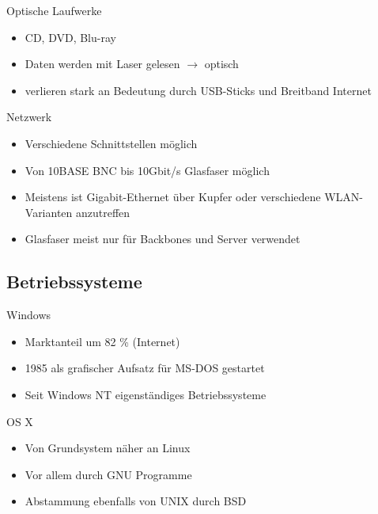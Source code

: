 \documentclass[aspectratio=43]{beamer}
\begin{document}
\begin{frame} 

	\begin{block}{Optische Laufwerke} 
	\begin{itemize}
	\item CD, DVD, Blu-ray
	\item Daten werden mit Laser gelesen $\rightarrow$ optisch
	\item verlieren stark an Bedeutung durch USB-Sticks und Breitband Internet
	\end{itemize}
	\end{block}

	\begin{block}{Netzwerk} 
	\begin{itemize}
	\item Verschiedene Schnittstellen möglich
	\item Von 10BASE BNC bis 10Gbit/s Glasfaser möglich
	\item Meistens ist Gigabit-Ethernet über Kupfer oder verschiedene WLAN-Varianten anzutreffen
	\item Glasfaser meist nur für Backbones und Server verwendet
	\end{itemize}
	\end{block}
\end{frame}

\subsection{Betriebssysteme}


\begin{frame} 

	\begin{block}{Windows} 
	\begin{itemize}
	\item Marktanteil um 82 \% (Internet)
	\item 1985 als grafischer Aufsatz für MS-DOS gestartet
	\item Seit Windows NT eigenständiges Betriebssysteme
	\end{itemize}
	\end{block}
	
	\begin{block}{OS X} 
	\begin{itemize}
	\item Von Grundsystem näher an Linux
	\item Vor allem durch GNU Programme
	\item Abstammung ebenfalls von UNIX durch  BSD 
	\end{itemize}
	\end{block}

\end{frame}
\end{document}
